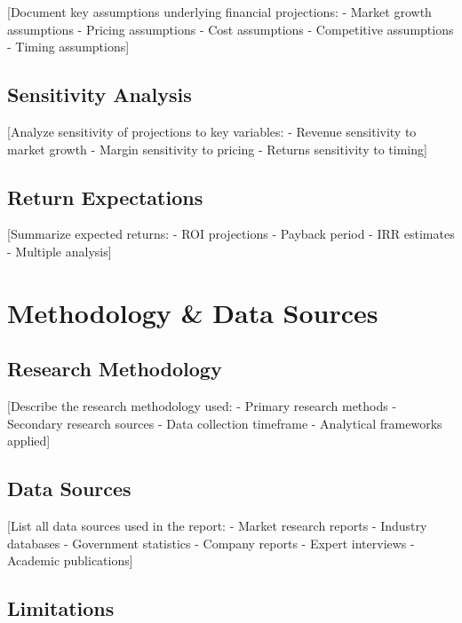 \documentclass[11pt,letterpaper]{report}
\begin{document}
[Document key assumptions underlying financial projections:
- Market growth assumptions
- Pricing assumptions
- Cost assumptions
- Competitive assumptions
- Timing assumptions]

\section{Sensitivity Analysis}

[Analyze sensitivity of projections to key variables:
- Revenue sensitivity to market growth
- Margin sensitivity to pricing
- Returns sensitivity to timing]

\section{Return Expectations}

[Summarize expected returns:
- ROI projections
- Payback period
- IRR estimates
- Multiple analysis]

\appendix

\chapter{Methodology \& Data Sources}

\section{Research Methodology}

[Describe the research methodology used:
- Primary research methods
- Secondary research sources
- Data collection timeframe
- Analytical frameworks applied]

\section{Data Sources}

[List all data sources used in the report:
- Market research reports
- Industry databases
- Government statistics
- Company reports
- Expert interviews
- Academic publications]

\section{Limitations}
\end{document}
